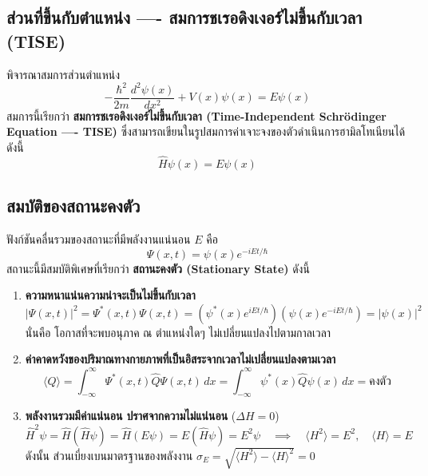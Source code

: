 \subsection{ส่วนที่ขึ้นกับตำแหน่ง ---- สมการชเรอดิงเงอร์ไม่ขึ้นกับเวลา (TISE)}
พิจารณาสมการส่วนตำแหน่ง
\begin{equation}
-\frac{\hbar^2}{2m} \frac{d^2\psi(x)}{dx^2} + V(x)\psi(x) = E\psi(x)
\label{eq:tise_1d}
\end{equation}
สมการนี้เรียกว่า \textbf{สมการชเรอดิงเงอร์ไม่ขึ้นกับเวลา (Time-Independent Schrödinger Equation ---- TISE)} ซึ่งสามารถเขียนในรูปสมการค่าเจาะจงของตัวดำเนินการฮามิลโทเนียนได้ดังนี้
\begin{equation}
\hat{H}\psi(x) = E\psi(x)
\label{eq:tise_operator}
\end{equation}

\subsection{สมบัติของสถานะคงตัว}
ฟังก์ชันคลื่นรวมของสถานะที่มีพลังงานแน่นอน $E$ คือ
\begin{equation}
\Psi(x, t) = \psi(x) e^{-iEt/\hbar}
\label{eq:stationary_full}
\end{equation}
สถานะนี้มีสมบัติพิเศษที่เรียกว่า \textbf{สถานะคงตัว (Stationary State)} ดังนี้
\begin{enumerate}
    \item \textbf{ความหนาแน่นความน่าจะเป็นไม่ขึ้นกับเวลา}
    \begin{equation}
    |\Psi(x, t)|^2 = \Psi^*(x, t)\Psi(x, t) = \left( \psi^*(x) e^{iEt/\hbar} \right) \left( \psi(x) e^{-iEt/\hbar} \right) = |\psi(x)|^2
    \end{equation}
    นั่นคือ โอกาสที่จะพบอนุภาค ณ ตำแหน่งใดๆ ไม่เปลี่ยนแปลงไปตามกาลเวลา
    \item \textbf{ค่าคาดหวังของปริมาณทางกายภาพที่เป็นอิสระจากเวลาไม่เปลี่ยนแปลงตามเวลา}
    \begin{equation}
    \langle Q \rangle = \int_{-\infty}^{\infty} \Psi^*(x, t) \hat{Q} \Psi(x, t) \, dx = \int_{-\infty}^{\infty} \psi^*(x) \hat{Q} \psi(x) \, dx = \text{คงตัว}
    \end{equation}
    \item \textbf{พลังงานรวมมีค่าแน่นอน ปราศจากความไม่แน่นอน} ($\Delta H = 0$)
    \begin{equation}
    \hat{H}^2 \psi = \hat{H}(\hat{H}\psi) = \hat{H}(E\psi) = E(\hat{H}\psi) = E^2\psi \quad \implies \quad \langle H^2 \rangle = E^2, \quad \langle H \rangle = E
    \end{equation}
    ดังนั้น ส่วนเบี่ยงเบนมาตรฐานของพลังงาน $\sigma_E = \sqrt{\langle H^2 \rangle - \langle H \rangle^2} = 0$
\end{enumerate}

